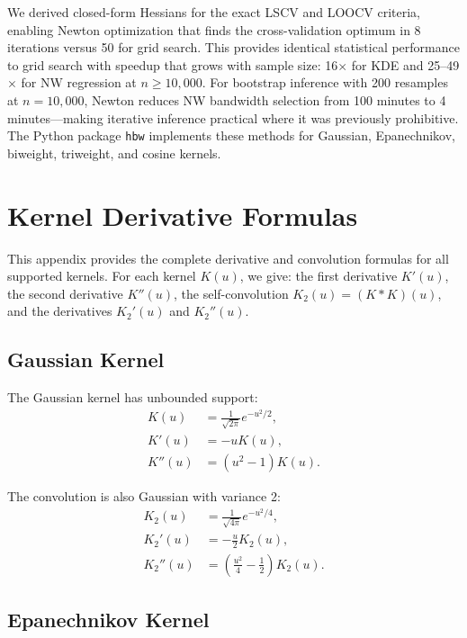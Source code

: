 \documentclass[11pt]{article}
\theoremstyle{definition}
\theoremstyle{remark}
\begin{document}
We derived closed-form Hessians for the exact LSCV and LOOCV criteria, enabling Newton optimization that finds the cross-validation optimum in 8 iterations versus 50 for grid search.
This provides identical statistical performance to grid search with speedup that grows with sample size: 16$\times$ for KDE and 25--49$\times$ for NW regression at $n \geq 10{,}000$.
For bootstrap inference with 200 resamples at $n=10{,}000$, Newton reduces NW bandwidth selection from 100 minutes to 4 minutes---making iterative inference practical where it was previously prohibitive.
The Python package \texttt{hbw} implements these methods for Gaussian, Epanechnikov, biweight, triweight, and cosine kernels.




\appendix

\section{Kernel Derivative Formulas}
\label{sec:appendix}

This appendix provides the complete derivative and convolution formulas for all supported kernels.
For each kernel $K(u)$, we give: the first derivative $K'(u)$, the second derivative $K''(u)$, the self-convolution $K_2(u) = (K * K)(u)$, and the derivatives $K_2'(u)$ and $K_2''(u)$.

\subsection{Gaussian Kernel}

The Gaussian kernel has unbounded support:
\begin{align}
K(u) &= \frac{1}{\sqrt{2\pi}} e^{-u^2/2}, \\
K'(u) &= -u K(u), \\
K''(u) &= (u^2 - 1) K(u).
\end{align}

The convolution is also Gaussian with variance 2:
\begin{align}
K_2(u) &= \frac{1}{\sqrt{4\pi}} e^{-u^2/4}, \\
K_2'(u) &= -\frac{u}{2} K_2(u), \\
K_2''(u) &= \left( \frac{u^2}{4} - \frac{1}{2} \right) K_2(u).
\end{align}

\subsection{Epanechnikov Kernel}
\end{document}
